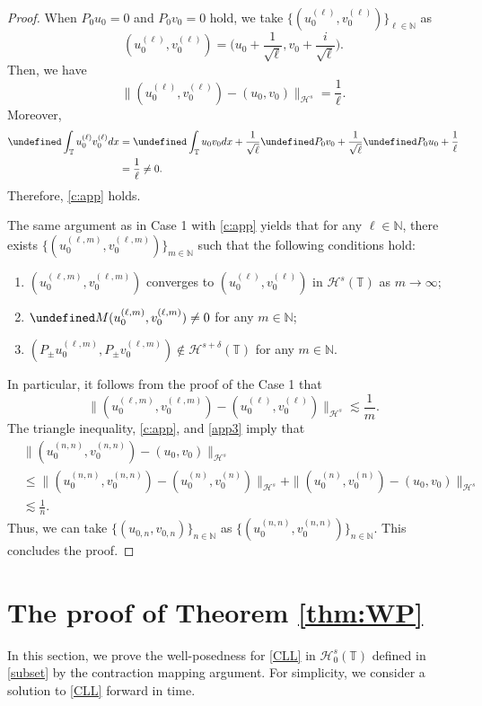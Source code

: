 \documentclass[%
11pt,  reqno]{amsart}
\newcommand{\T}{\mathbb{T}}
\newcommand{\N}{\mathbb{N}}
\renewcommand{\H}{\mathcal H}
\newcommand{\dl}{\delta}
\renewcommand{\l}{\ell}
\newcommand{\les}{\lesssim}
\numberwithin{equation}{section}
\numberwithin{theorem}{section}
\let\Re=\undefined\DeclareMathOperator*{\Re}{Re}
\let\Im=\undefined\DeclareMathOperator*{\Im}{Im}
\begin{document}
\begin{proof}
When $P_0 u_0 = 0$ and $P_0 v_0 = 0$ hold,
we take $\{(u_0^{(\l)}, v_0^{(\l)})\}_{\l \in \N}$ as
\[
(u_0^{(\l)}, v_0^{(\l)}) = \Big( u_0 + \frac 1{\sqrt \l}, v_0 + \frac i {\sqrt \l} \Big).
\]
Then, we have 
\[
\| (u_0^{(\l)}, v_0^{(\l)}) - (u_0, v_0) \|_{\H^s} = \frac 1\l.
\]
Moreover, 
\[
\begin{aligned}
\Im \int_\T  u_0^{(\l)} v_0^{(\l)} dx 
&=
\Im \int_\T u_0 v_0 dx + \frac 1{\sqrt \l}\Im P_0 v_0 + \frac 1{\sqrt \l} \Re P_0 u_0 
+ \frac 1{\l}  
\\
&= \frac 1{\l} \neq 0.
\end{aligned}
\]
Therefore, \eqref{c:app} holds.

The same argument as in Case 1 with \eqref{c:app} yields that
for any $\l \in \N$,
there exists $\{(u_0^{(\l, m)}, v_0^{(\l, m)}) \}_{m \in \N}$ such that
the following conditions hold:
\begin{enumerate}
\item $(u_0^{(\l, m)}, v_0^{(\l, m)})$ converges to $(u_0^{(\l)}, v_0^{(\l)})$ 
in $\H^s(\T)$ as $m \to \infty$;
\item $\Im M (u_0^{(\l, m)}, v_0^{(\l, m)}) \neq 0$ for any $m \in \N$;
\item $(P_\pm u_0^{(\l, m)}, P_\pm v_0^{(\l, m)}) \notin \H^{s+\dl}(\T)$ for any $m \in \N$.
\end{enumerate}
In particular,
it follows from the proof of the Case 1 that
\begin{equation}
\| (u_0^{(\l, m)}, v_0^{(\l, m)}) - (u_0^{(\l)}, v_0^{(\l)}) \|_{\H^s}
\les
\frac 1m.
\label{app3}
\end{equation}
The triangle inequality, \eqref{c:app}, and \eqref{app3} imply that
\[
\begin{aligned}
&\| (u_0^{(n,n)}, v_0^{(n,n)}) - (u_0, v_0) \|_{\H^s}
\\
&\le
\| (u_0^{(n, n)}, v_0^{(n, n)}) - (u_0^{(n)}, v_0^{(n)}) \|_{\H^s}
+ \| (u_0^{(n)}, v_0^{(n)}) - (u_0, v_0) \|_{\H^s}
\\
&\les \frac 1n.
\end{aligned}
\]
Thus, we can take $\{ (u_{0, n}, v_{0, n}) \}_{n \in \N}$ as 
$ \{ (u_0^{(n,n)}, v_0^{(n,n)}) \}_{n \in \N}$.
This concludes the proof.
\end{proof}

\section{The proof of Theorem \ref{thm:WP}}
\label{SEC:WP}
In this section, we prove the well-posedness for \eqref{CLL} in $\H_0^s(\T)$ 
defined in \eqref{subset} by the contraction mapping argument.
For simplicity, we consider a solution to \eqref{CLL} forward in time.
\end{document}
